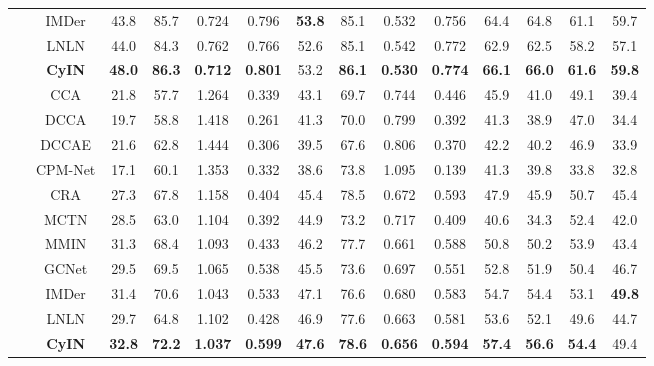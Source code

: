 \documentclass{article}
\begin{document}
\begin{table}[htbp]
{\begin{tabular}{cccccccccccccc}
        ~ & IMDer & 43.8  & 85.7  & 0.724  & 0.796  & \textbf{53.8}  & 85.1  & 0.532  & 0.756  & 64.4  & 64.8  & 61.1  & 59.7 \\
        ~ & LNLN & 44.0  & 84.3  & 0.762  & 0.766  & 52.6  & 85.1  & 0.542  & 0.772  & 62.9  & 62.5  & 58.2  & 57.1  \\ 
    ~ & \textbf{CyIN}  & \textbf{48.0} & \textbf{86.3} & \textbf{0.712} & \textbf{0.801} & 53.2 & \textbf{86.1} & \textbf{0.530} & \textbf{0.774} & \textbf{66.1} & \textbf{66.0} & \textbf{61.6} & \textbf{59.8} \\ 
    \midrule[0.5pt]
    ~ & CCA & 21.8  & 57.7  & 1.264  & 0.339  & 43.1  & 69.7  & 0.744  & 0.446  & 45.9  & 41.0  & 49.1  & 39.4   \\ 
        ~ & DCCA & 19.7  & 58.8  & 1.418  & 0.261  & 41.3  & 70.0  & 0.799  & 0.392  & 41.3  & 38.9  & 47.0  & 34.4   \\ 
        ~ & DCCAE & 21.6  & 62.8  & 1.444  & 0.306  & 39.5  & 67.6  & 0.806  & 0.370  & 42.2  & 40.2  & 46.9  & 33.9   \\ 
        ~ & CPM-Net & 17.1  & 60.1  & 1.353  & 0.332  & 38.6  & 73.8  & 1.095  & 0.139  & 41.3  & 39.8  & 33.8  & 32.8   \\ 
        ~ & CRA & 27.3  & 67.8  & 1.158  & 0.404  & 45.4  & 78.5  & 0.672  & 0.593  & 47.9  & 45.9  & 50.7  & 45.4   \\ 
        ~ & MCTN & 28.5  & 63.0  & 1.104  & 0.392  & 44.9  & 73.2  & 0.717  & 0.409  & 40.6  & 34.3  & 52.4  & 42.0   \\ 
        ~ & MMIN & 31.3  & 68.4  & 1.093  & 0.433  & 46.2  & 77.7  & 0.661  & 0.588  & 50.8  & 50.2  & 53.9  & 43.4  \\ 
        ~ & GCNet & 29.5  & 69.5  & 1.065  & 0.538  & 45.5  & 73.6  & 0.697  & 0.551  & 52.8  & 51.9  & 50.4  & 46.7   \\ 
        ~ & IMDer & 31.4  & 70.6  & 1.043  & 0.533  & 47.1  & 76.6  & 0.680  & 0.583  & 54.7  & 54.4  & 53.1  & \textbf{49.8}  \\ 
        ~ & LNLN & 29.7  & 64.8  & 1.102  & 0.428  & 46.9  & 77.6  & 0.663  & 0.581  & 53.6  & 52.1  & 49.6  & 44.7  \\ 
    ~ & \textbf{CyIN}  & \textbf{32.8} & \textbf{72.2} & \textbf{1.037} & \textbf{0.599} & \textbf{47.6} & \textbf{78.6} & \textbf{0.656} & \textbf{0.594} & \textbf{57.4} & \textbf{56.6} & \textbf{54.4} & 49.4 \\ 

\end{tabular}}
\end{table}
\end{document}
